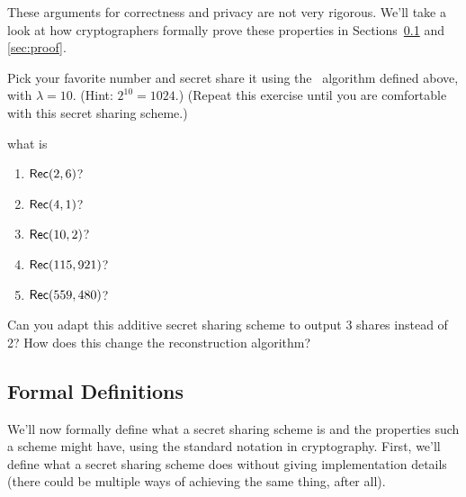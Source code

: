 These arguments for correctness and privacy are not very rigorous. We'll 
take a look at how cryptographers formally prove these properties in Sections~\ref{sec:formal-defs} 
and \ref{sec:proof}.

\begin{exercise}
    Pick your favorite number and secret share it using the \share~algorithm 
    defined above, with $\lambda=10$. (Hint: $2^{10}=1024$.)
    (Repeat this exercise until you are comfortable with this secret sharing 
    scheme.)
\end{exercise}

\begin{exercise}
     what is
    \renewcommand{\labelenumi}{(\alph{enumi})} 
    \begin{enumerate}%
        \item $\mathsf{Rec}(2, 6)$?
        \item $\mathsf{Rec}(4, 1)$?
        \item $\mathsf{Rec}(10, 2)$?
        \item $\mathsf{Rec}(115, 921)$?
        \item $\mathsf{Rec}(559, 480)$?
    \end{enumerate}
\end{exercise}

\begin{exercise}
    Can you adapt this additive secret sharing scheme to output 
    3 shares instead of 2? How does this change the reconstruction 
    algorithm?
\end{exercise}

\subsection{Formal Definitions}\label{sec:formal-defs}

We'll now formally define what a secret sharing scheme is and the 
properties such a scheme might have, using the standard notation in 
cryptography. First, we'll define what a secret sharing scheme 
does without giving implementation details (there could be multiple ways 
of achieving the same thing, after all). 

